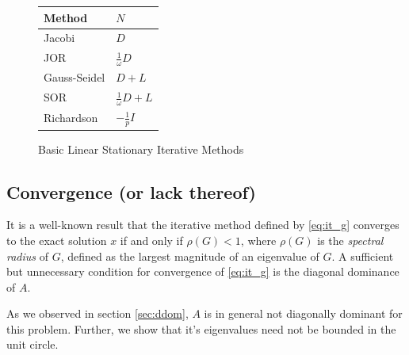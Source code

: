 \documentclass[10pt]{article}
\begin{document}
\begin{multicols}{2}
\begin{figure}[H]
	\centering
	\begin{tabular}{ll}
		\toprule
		Method & $N$ \\
		\midrule
		Jacobi & $D$ \\
		JOR & $\frac{1}{\omega}D$ \\
		Gauss-Seidel & $D + L$ \\
		SOR & $\frac{1}{\omega}D + L$ \\
		Richardson & $-\frac{1}{p}I$ \\
		\bottomrule
	\end{tabular}
	\caption{Basic Linear Stationary Iterative Methods \citep{young_iterative_1971}}
\end{figure}





\subsection{Convergence (or lack thereof)}

It is a well-known result \citep{anderson_analysis_2012} that the iterative method defined by \eqref{eq:it_g} converges to the exact solution $x$ if and only if $\rho(G) < 1$, where $\rho(G)$ is the \textit{spectral radius} of $G$, defined as the largest magnitude of an eigenvalue of $G$.
A sufficient but unnecessary condition for convergence of \eqref{eq:it_g} is the diagonal dominance of $A$.

As we observed in section \ref{sec:ddom}, $A$ is in general not diagonally dominant for this problem.
Further, we show that it's eigenvalues need not be bounded in the unit circle.


\end{multicols}
\end{document}
